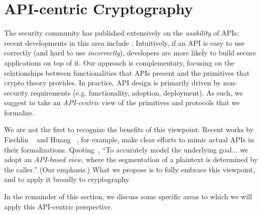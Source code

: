 \section{API-centric Cryptography}
The security community has published extensively on the \emph{usability} of
APIs; recent developments in this area include \cite{ABF+,HHL+17,IKND16}.
Intuitively, if an API is easy to use correctly (and hard to use
\emph{incorrectly}), developers are more likely to build secure applications on
top of it.
%
Our approach is complementary, focusing on the relationships between
functionalities that APIs present and the primitives that crypto theory
provides. In practice, API design is primarily driven by non-security
requirements (e.g. functionality, adoption, deployment).
%
As such, we suggest to take an
\emph{API-centric} view of the primitives and protocols that we
formalize.  

We are not the first to recognize the benefits of this viewpoint.
Recent works by Fischlin \etal~\cite{FPMG15} and Huang
\etal~\cite{HRRV15}, for example, make clear efforts to mimic actual
APIs in their formalizations.  Quoting~\cite{HRRV15}, ``To
accurately model the underlying goal... we adopt an \emph{API-based
  view}, where the segmentation of a plaintext is determined by the
caller.'' (Our emphasis.)  What we propose is to fully embrace this
viewpoint, and to apply it broadly to cryptography.

In the remainder of this section, we discuss some specific areas to which we will apply
this API-centric perspective.
%


